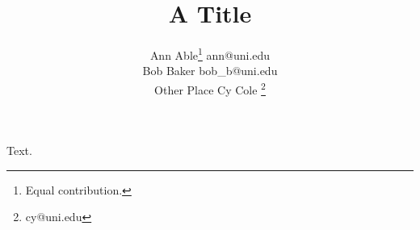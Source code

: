\documentclass{article}
\title{A Title}
\author{\name Ann Able\footnote{Equal contribution.} \email ann@uni.edu\\
       \vspace{-0.6cm}
       \AND
       \name Bob Baker \email bob\_b@uni.edu \\
       \addr Other Place
       \AND
       \name Cy Cole \thanks{cy@uni.edu}}
\begin{document}
\maketitle
Text.
\end{document}
